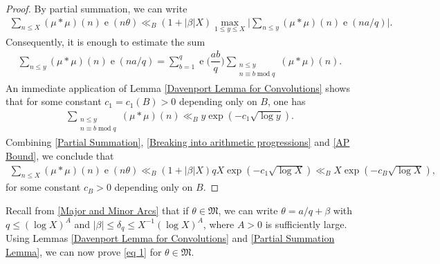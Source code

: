 \documentclass[11pt]{amsart}
\numberwithin{equation}{section}
\numberwithin{figure}{section}
\theoremstyle{definition}
\newcommand{\e}{\operatorname{e}}
\newcommand{\modu}{\operatorname{mod}}
\begin{document}
\begin{proof} By partial summation, we can write
\begin{align}\label{Partial Summation}
     \sum_{n\leqslant X }(\mu*\mu)(n)\e(n\theta)\ll_B (1 + |\beta|X)\max_{1\leqslant y\leqslant X }\bigg|\sum_{n\leqslant y}(\mu*\mu)(n)\e(na/q)\bigg|.
\end{align}
Consequently, it is enough to estimate the sum
\begin{align}\label{Breaking into arithmetic progressions}
    \sum_{n\leqslant y}(\mu*\mu)(n)\e(na/q)=\sum_{b=1}^q \e\bigg(\dfrac{ab}{q}\bigg)\sum_{\substack{n\leqslant y\\ n\equiv b\modu q}}(\mu*\mu)(n).
\end{align}
An immediate application of Lemma \ref{Davenport Lemma for Convolutions} shows that for some constant $c_1=c_1(B)>0$ depending only on $B$, one has
\begin{align}\label{AP Bound}
  \sum_{\substack{n\leqslant y\\ n \equiv b \modu q}}(\mu*\mu)(n)\ll_B y \exp(-c_1\sqrt{\log y}).
\end{align}
Combining \eqref{Partial Summation}, \eqref{Breaking into arithmetic progressions} and \eqref{AP Bound}, we conclude that
\begin{align*}
     \sum_{n\leqslant X }(\mu*\mu)(n)\e(n\theta)\ll_B (1+|\beta|X)qX\exp(-c_1\sqrt{\log X}) \ll_B X\exp(-c_B\sqrt{\log X}),
\end{align*}
for some constant $c_B>0$ depending only on $B$.
\end{proof}
Recall from \eqref{Major and Minor Arcs} that if $\theta \in \mathfrak{M}$, we can write $\theta=a/q+\beta$ with $q\leqslant(\log X)^A$ and $|\beta|\leqslant\delta_q \leqslant X ^{-1}(\log X)^A$, where $A>0$ is sufficiently large. Using Lemmas \ref{Davenport Lemma for Convolutions} and \ref{Partial Summation Lemma}, we can now prove \eqref{eq 1} for $\theta \in \mathfrak{M}$.
\end{document}
